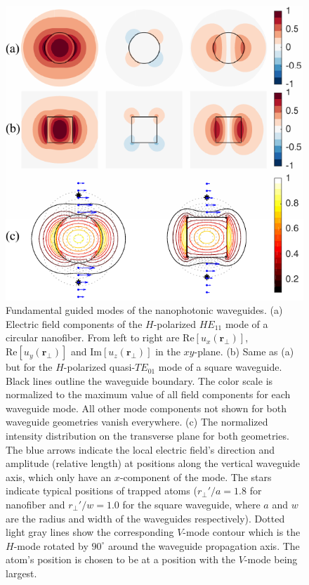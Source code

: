 \documentclass[preprint,aps,pra,onecolumn,superscriptaddress]{revtex4-1} %
\def\br{\mathbf{r}}
\newcommand{\SWG}{square waveguide\xspace}%
\begin{document}
\begin{figure}[htb]
\centering
  \includegraphics[width=.49\textwidth]{fig/nanofiberswg_Hmode6}
  \caption{Fundamental guided modes of the nanophotonic waveguides. (a) Electric field components of the $H$-polarized $HE_{11}$ mode of a circular nanofiber. From left to right are $ \mathrm{Re}[u_x(\br\!_\perp)] $, $ \mathrm{Re}[u_y(\br\!_\perp)] $ and $ \mathrm{Im}[u_z(\br\!_\perp)] $ in the $ xy $-plane. (b) Same as (a) but for  the $H$-polarized quasi-$TE_{01}$ mode of a square waveguide. Black lines outline the waveguide boundary. The color scale is normalized to the maximum value of all field components for each waveguide mode. All other mode components not shown for both waveguide geometries vanish everywhere. (c) The normalized intensity distribution on the transverse plane for both geometries. The blue arrows indicate the local electric field's direction and amplitude (relative length) at positions along the vertical waveguide axis, which only have an $ x $-component of the mode. The stars indicate typical positions of trapped atoms ($r_\perp'/a=1.8  $ for nanofiber and $ r_\perp'/w=1.0 $ for the \SWG, where $ a $ and $ w $ are the radius and width of the waveguides respectively). Dotted light gray lines show the corresponding $ V $-mode contour which is the $ H $-mode rotated by $ 90^\circ $ around the waveguide propagation axis. The atom's position is chosen to be at a position with the $V$-mode being largest. }\label{fig:nanofiberSWG_E_ints}
\end{figure}
\end{document}
